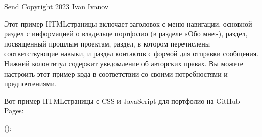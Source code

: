 \documentclass[letterpaper,10pt,russian]{sphinxmanual}
\begin{document}
\begin{sphinxVerbatim}[commandchars=\\\{\}]
                 Send
        Copyright  2023 Ivan Ivanov
\end{sphinxVerbatim}

\sphinxAtStartPar
Этот пример HTML\sphinxhyphen{}страницы включает заголовок с меню навигации, основной раздел с информацией о владельце портфолио (в разделе «Обо мне»), раздел, посвященный прошлым проектам, раздел, в котором перечислены соответствующие навыки, и раздел контактов с формой для отправки сообщения. Нижний колонтитул содержит уведомление об авторских правах. Вы можете настроить этот пример кода в соответствии со своими потребностями и предпочтениями.

\sphinxAtStartPar
Вот пример HTML\sphinxhyphen{}страницы с CSS и JavaScript для портфолио на GitHub Pages:

\sphinxAtStartPar
():
\end{document}
